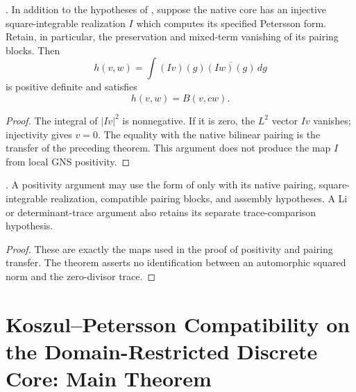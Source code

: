 \begin{theorem}
\label{v4-arith:w5-c:thm:P3-discrete-core}
\ClaimStatusProvedHereConditional. In addition to the hypotheses
of , suppose the
native core has an injective square-integrable realization $I$
which computes its specified Petersson form. Retain, in particular,
the preservation and mixed-term vanishing of its pairing blocks.
Then
\begin{equation}
 h(v,w)=\int (Iv)(g)\overline{(Iw)(g)}\,dg
 \label{v4-arith:w5-c:eq:P3-form}
\end{equation}
is positive definite and satisfies
\begin{equation}
 h(v,w)=B(v,cw).
 \label{v4-arith:w5-c:eq:P3-compatibility}
\end{equation}
\end{theorem}
\begin{proof}
The integral of $|Iv|^2$ is nonnegative. If it is zero, the
$L^2$ vector $Iv$ vanishes; injectivity gives $v=0$.
The equality with the native bilinear pairing is the transfer
of the preceding theorem. This argument does not produce the
map $I$ from local GNS positivity.
\end{proof}

\begin{corollary}
\label{v4-arith:w5-c:cor:P3-input}
\ClaimStatusProvedHereConditional. A positivity argument may use
the form of  only
with its native pairing, square-integrable realization, compatible
pairing blocks, and assembly hypotheses. A Li or determinant-trace argument also
retains its separate trace-comparison hypothesis.
\end{corollary}
\begin{proof}
These are exactly the maps used in the proof of positivity and
pairing transfer. The theorem asserts no identification between
an automorphic squared norm and the zero-divisor trace.
\end{proof}

\section{Koszul--Petersson Compatibility on the Domain-Restricted Discrete Core: Main Theorem}
\label{v4-arith:w5-c:main-theorem}

